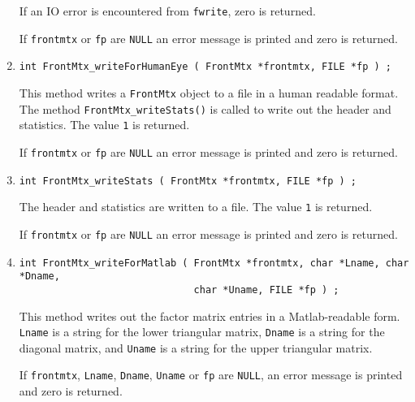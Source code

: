 \begin{enumerate}
If an IO error is encountered from {\tt fwrite}, zero is returned.
\par {}
If {\tt frontmtx} or {\tt fp} are {\tt NULL} an error message
is printed and zero is returned.
\item
\begin{verbatim}
int FrontMtx_writeForHumanEye ( FrontMtx *frontmtx, FILE *fp ) ;
\end{verbatim}
\par
This method writes a {\tt FrontMtx} object to a file in a human
readable format.
The method {\tt FrontMtx\_writeStats()} is called to write out the
header and statistics.
The value {\tt 1} is returned.
\par {}
If {\tt frontmtx} or {\tt fp} are {\tt NULL} an error message
is printed and zero is returned.
\item
\begin{verbatim}
int FrontMtx_writeStats ( FrontMtx *frontmtx, FILE *fp ) ;
\end{verbatim}
\par
The header and statistics are written to a file.
The value {\tt 1} is returned.
\par {}
If {\tt frontmtx} or {\tt fp} are {\tt NULL} an error message
is printed and zero is returned.
\item
\begin{verbatim}
int FrontMtx_writeForMatlab ( FrontMtx *frontmtx, char *Lname, char *Dname,
                              char *Uname, FILE *fp ) ;
\end{verbatim}
\par
This method writes out the factor matrix entries in a
Matlab-readable form.
{\tt Lname} is a string for the lower triangular matrix,
{\tt Dname} is a string for the diagonal matrix,
and {\tt Uname} is a string for the upper triangular matrix.
\par {}
If {\tt frontmtx}, {\tt Lname}, {\tt Dname}, {\tt Uname} 
or {\tt fp} are {\tt NULL},
 an error message is printed and zero is returned.
\end{enumerate}
\par

